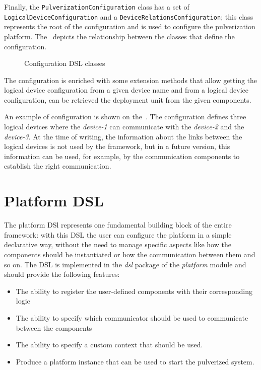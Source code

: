 Finally, the \texttt{PulverizationConfiguration} class has a set of \texttt{LogicalDeviceConfiguration} and a \texttt{DeviceRelationsConfiguration};
this class represents the root of the configuration and is used to configure the pulverization platform.
The~ depicts the relationship between the classes that define the configuration.

\begin{figure}
	\centering
	\caption{Configuration DSL classes}
	\label{fig:configuration-dsl-classes}
\end{figure}

The configuration is enriched with some extension methods that allow getting the logical device configuration from a given device name and
from a logical device configuration, can be retrieved the deployment unit from the given components.



An example of configuration is shown on the~. The configuration defines three logical devices where the
\emph{device-1} can communicate with the \emph{device-2} and the \emph{device-3}. At the time of writing, the information about the links
between the logical devices is not used by the framework, but in a future version, this information can be used, for example, by the communication
components to establish the right communication.


\section{Platform DSL}
\label{sec:platform-dsl-impl}

The platform DSl represents one fundamental building block of the entire framework: with this DSL the user can configure the platform in a simple
declarative way, without the need to manage specific aspects like how the components should be instantiated or how the communication between them
and so on. The DSL is implemented in the \emph{dsl} package of the \emph{platform} module and should provide the following features:
\begin{itemize}
	\item The ability to register the user-defined components with their corresponding logic
	\item The ability to specify which communicator should be used to communicate between the components
	\item The ability to specify a custom context that should be used.
	\item Produce a platform instance that can be used to start the pulverized system.
\end{itemize}

